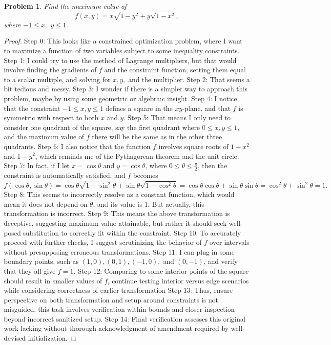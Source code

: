 \documentclass{article}
\newtheorem{theorem}{Problem}
\begin{document}
\begin{theorem}
Find the maximum value of \[f(x,y) = x \sqrt{1 - y^2} + y \sqrt{1 - x^2},\] where $-1 \le x,$ $y \le 1.$
\end{theorem}

\begin{proof}
Step 0: This looks like a constrained optimization problem, where I want to maximize a function of two variables subject to some inequality constraints.
Step 1: I could try to use the method of Lagrange multipliers, but that would involve finding the gradients of $f$ and the constraint function, setting them equal to a scalar multiple, and solving for $x, y,$ and the multiplier.
Step 2: That seems a bit tedious and messy.
Step 3: I wonder if there is a simpler way to approach this problem, maybe by using some geometric or algebraic insight.
Step 4: I notice that the constraint $-1 \le x, y \le 1$ defines a square in the $xy$-plane, and that $f$ is symmetric with respect to both $x$ and $y$.
Step 5: That means I only need to consider one quadrant of the square, say the first quadrant where $0 \le x, y \le 1$, and the maximum value of $f$ there will be the same as in the other three quadrants.
Step 6: I also notice that the function $f$ involves square roots of $1 - x^2$ and $1 - y^2$, which reminds me of the Pythagorean theorem and the unit circle.
Step 7: In fact, if I let $x = \cos \theta$ and $y = \cos \theta$, where $0 \le \theta \le \frac{\pi}{2}$, then the constraint is automatically satisfied, and $f$ becomes \n\[f(\cos \theta, \sin \theta) = \cos \theta \sqrt{1 - \sin^2 \theta} + \sin \theta \sqrt{1 - \cos^2 \theta} = \cos \theta \cos \theta + \sin \theta \sin \theta = \cos^2 \theta + \sin^2 \theta = 1.\]
Step 8: This seems to incorrectly resolve as a constant function, which would mean it does not depend on $\theta$, and its value is $1$. But actually, this transformation is incorrect.
Step 9: This means the above transformation is deceptive, suggesting maximum value attainable, but rather it should seek well-posed substitution to correctly fit within the constraint.
Step 10: To accurately proceed with further checks, I suggest scrutinizing the behavior of $f$ over intervals without presupposing erroneous transformations.
Step 11: I can plug in some boundary points, such as $(1, 0), (0, 1), (-1, 0),$ and $(0, -1)$, and verify that they all give $f = 1$.
Step 12: Comparing to some interior points of the square should result in smaller values of $f$, continue testing interior versus edge scenarios while considering correctness of earlier transformation
Step 13: Thus, ensure perspective on both transformation and setup around constraints is not misguided, this task involves verification within bounds and closer inspection beyond incorrect sanitized setup.
Step 14: Final verification assesses this original work lacking without thorough acknowledgment of amendment required by well-devised initialization.
\end{proof}
\end{document}
